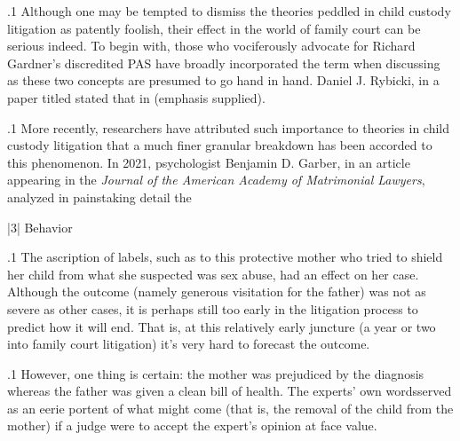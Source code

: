 \documentclass[11pt, twoside]{article}
\begin{document}
{\p.1{%
\noindent{}Although one may be tempted to dismiss the  theories
peddled in child custody litigation as patently foolish, their effect in the
world of family court can be serious indeed. To begin with, those who
vociferously advocate for Richard Gardner’s discredited PAS have broadly incorporated the term  when discussing 
as these two concepts are presumed to go hand in hand. Daniel J. Rybicki, in a paper titled  stated that in  (emphasis supplied).
}%

\p.1{%
More recently, researchers have attributed such importance to  theories in child custody litigation that a much finer granular breakdown has been accorded to this phenomenon. In 2021, psychologist Benjamin D. Garber,
in an article appearing in the \textit{Journal of
the American Academy of Matrimonial Lawyers}, analyzed in painstaking
detail the 
}%


\s|3|{ Behavior}

\p.1{%
\noindent{}The ascription of labels, such as  to this protective mother
who tried to shield her child from what she suspected was sex abuse, had
an effect on her case. Although the outcome (namely generous visitation
for the father) was not as severe as other cases, it is perhaps still too
early in the litigation process to predict how it will end. That is, at this
relatively early juncture (a year or two into family court litigation) it’s
very hard to forecast the outcome.
}%

\p.1{%
However, one thing is certain: the mother was prejudiced by the  diagnosis whereas the father was given a clean bill of health.
The experts’ own words\mdash{}\mdash{}served
as an eerie portent of what might come (that is, the removal of the child
from the mother) if a judge were to accept the expert’s opinion at face
value.
}%

}
\end{document}
